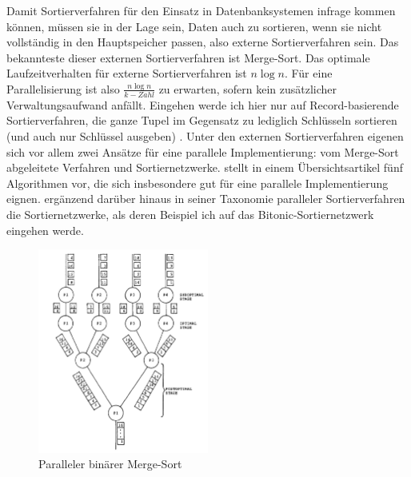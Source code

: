 \documentclass[a4paper,12pt,twoside]{article}
\begin{document}
Damit Sortierverfahren für den Einsatz in Datenbanksystemen infrage kommen können, müssen sie in der Lage sein, Daten auch zu sortieren, wenn sie nicht vollständig in den Hauptspeicher passen, also externe Sortierverfahren sein. Das bekannteste dieser externen Sortierverfahren ist Merge-Sort. Das optimale Laufzeitverhalten für externe Sortierverfahren ist $ n \log n $. Für eine Parallelisierung ist also $ \frac{n \log n} {k-Zahl} $ zu erwarten, sofern kein zusätzlicher Verwaltungsaufwand anfällt. Eingehen werde ich hier nur auf Record-basierende Sortierverfahren, die ganze Tupel im Gegensatz zu lediglich Schlüsseln sortieren (und auch nur Schlüssel ausgeben) {\autocite{Salzberg1990}}. Unter den externen Sortierverfahren eigenen sich vor allem zwei Ansätze für eine parallele Implementierung: vom Merge-Sort abgeleitete Verfahren und Sortiernetzwerke. {\textcite[S. 831ff]{Taniar2000}} stellt in einem Übersichtsartikel fünf Algorithmen vor, die sich insbesondere gut für eine parallele Implementierung eignen. {\textcite[S. 9ff] {Bitton1984}} ergänzend darüber hinaus in seiner Taxonomie paralleler Sortierverfahren die Sortiernetzwerke, als deren Beispiel ich auf das Bitonic-Sortiernetzwerk eingehen werde.

\begin{figure}
	\centering
	\includegraphics[width=0.5\textwidth]{Bilder/b-merge-sort.png}
	\caption{Paralleler binärer Merge-Sort \autocite[S. 334]{Bitton1983}}
	\label{img:bMergeSort}
\end{figure}
\end{document}
